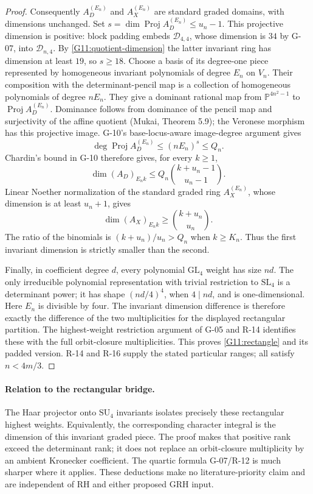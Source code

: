 \begin{proof}
Consequently $A_D^{(E_n)}$ and $A_X^{(E_n)}$ are standard
graded domains, with dimensions unchanged. Set
$s=\dim\operatorname{Proj}A_D^{(E_n)}\leq u_n-1$.
This projective dimension is positive: block padding embeds
$\mathcal D_{4,4}$, whose dimension is $34$ by G-07,
into $\mathcal D_{n,4}$. By \eqref{G11:quotient-dimension}
the latter invariant ring has dimension at least $19$,
so $s\geq18$.
Choose a basis of its degree-one piece represented by
homogeneous invariant polynomials of degree $E_n$ on $V_n$.
Their composition with the determinant-pencil map is a
collection of homogeneous polynomials of degree $nE_n$.
They give a dominant rational map from
$\mathbb P^{4n^2-1}$ to $\operatorname{Proj}A_D^{(E_n)}$.
Dominance follows from dominance of the pencil map and
surjectivity of the affine quotient (Mukai, Theorem 5.9);
the Veronese morphism has this projective image. G-10's
base-locus-aware image-degree argument gives
\[
 \deg\operatorname{Proj}A_D^{(E_n)}
 \leq(nE_n)^s\leq Q_n.
\]
Chardin's bound in G-10 therefore gives, for every $k\geq1$,
\[
 \dim(A_D)_{E_nk}
 \leq Q_n\binom{k+u_n-1}{u_n-1}.
\]
Linear Noether normalization of the standard graded ring
$A_X^{(E_n)}$, whose dimension is at least $u_n+1$, gives
\[
 \dim(A_X)_{E_nk}\geq\binom{k+u_n}{u_n}.
\]
The ratio of the binomials is $(k+u_n)/u_n>Q_n$ when
$k\geq K_n$. Thus the first invariant dimension is strictly
smaller than the second.

Finally, in coefficient degree $d$, every polynomial
$\mathrm{GL}_4$ weight has size $nd$. The only irreducible
polynomial representation with trivial restriction to
$\mathrm{SL}_4$ is a determinant power; it has shape
$(nd/4)^4$, when $4\mid nd$, and is one-dimensional.
Here $E_n$ is divisible by four. The invariant dimension
difference is therefore exactly the difference of the two
multiplicities for the displayed rectangular partition.
The highest-weight restriction argument of G-05 and R-14
identifies these with the full orbit-closure multiplicities.
This proves \eqref{G11:rectangle} and its padded version.
R-14 and R-16 supply the stated particular ranges; all
satisfy $n<4m/3$.
\end{proof}
\paragraph{Relation to the rectangular bridge.}
The Haar projector onto $\mathrm{SU}_4$ invariants isolates
precisely these rectangular highest weights. Equivalently,
the corresponding character integral is the dimension of
this invariant graded piece. The proof makes that positive
rank exceed the determinant rank; it does not replace an
orbit-closure multiplicity by an ambient Kronecker
coefficient. The quartic formula G-07/R-12 is much sharper
where it applies. These deductions make no literature-priority
claim and are independent of RH and either proposed GRH input.

